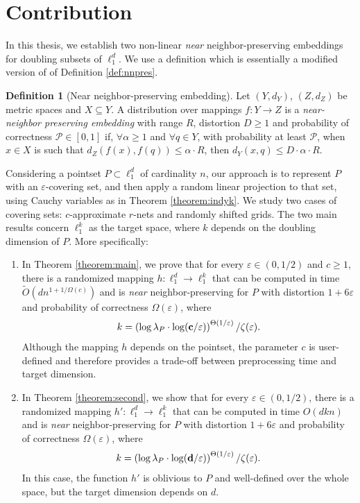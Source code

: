 \documentclass[10pt,a4paper,twoside]{book}
\newcommand{\mbf}[1]{\mbox{\boldmath$\rm{#1}$}}
\newcommand{\eps}{\varepsilon}
\theoremstyle{definition}
\newtheorem{definition}{Definition}[chapter]
\theoremstyle{remark}
\begin{document}
\section{Contribution}
In this thesis, we establish two non-linear \textit{near} neighbor-preserving embeddings for doubling subsets of $\ell_1^d$. We use a definition which is essentially a modified version of of Definition \ref{def:nnpres}.

\begin{definition}[Near neighbor-preserving embedding]  \label{Dnnpres}
Let $(Y,d_Y)$, $(Z,d_Z)$ be metric spaces and $X \subseteq Y$.
A distribution over mappings $f:Y \rightarrow Z$ is
a {\em near-neighbor preserving embedding} with range $R$, distortion $D \geq 1$
and probability of correctness $\mathcal{P} \in [0,1]$ if,
$\forall \alpha \geq 1$ and $\forall q\in Y$, with probability at least $\mathcal{P}$, 
when $x\in X$ is such that $d_Z(f(x),f(q))\leq \alpha \cdot R$, then $d_Y(x,q)\leq D \cdot \alpha \cdot R$.
\end{definition}

Considering a pointset $P \subset \ell_1^d$ of cardinality $n$, our approach is to represent $P$ with an $\eps$-covering set, and then apply a random linear projection to that set, using Cauchy variables as in Theorem \ref{theorem:indyk}. We study two cases of covering sets: $c$-approximate $r$-nets and randomly shifted grids. The two main results concern $\ell_1^k$ as the target space, where $k$ depends on the doubling dimension of $P$. More specifically:

\begin{enumerate}
    \item In Theorem \ref{theorem:main}, we prove that for every $\eps \in (0,1/2)$ and $c \geq 1$, there is a randomized mapping $h: \ell_1^d \rightarrow \ell_1^k$ that can be computed in time $\tilde{O}(dn^{1+1/ \Omega(c)})$ and is \textit{near} neighbor-preserving for $P$ with distortion $1{+}6\eps$ and probability of correctness $\Omega(\eps)$, where
    \[ k = \left( \log{\lambda_P} \cdot \log(\mbf{c} / \eps) \right)^{\Theta(1/\eps)} / \zeta(\eps). \]
    Although the mapping $h$ depends on the pointset, the parameter $c$ is user-defined and therefore provides a trade-off between preprocessing time and target dimension.
    
    \item In Theorem \ref{theorem:second}, we show that for every $\eps \in (0,1/2)$, there is a randomized mapping $h': \ell_1^d \rightarrow \ell_1^k$ that can be computed in time $O(dkn)$ and is \textit{near} neighbor-preserving for $P$ with distortion $1{+}6 \eps$ and probability of correctness $\Omega(\eps)$, where
    \[ k = \left( \log{\lambda_P} \cdot \log(\mbf{d} / \eps) \right)^{\Theta(1/\eps)} / \zeta(\eps).  \]
    In this case, the function $h'$ is oblivious to $P$ and well-defined over the whole space, but the target dimension depends on $d$.
\end{enumerate}
\end{document}
